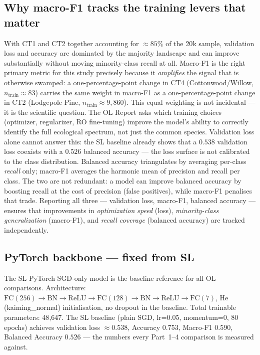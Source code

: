 \documentclass[conference]{IEEEtran}
\begin{document}
\subsection{Why macro-F1 tracks the training levers that matter}\label{sec:data:metric}
With CT1 and CT2 together accounting for ${\approx}85\%$ of the 20k sample,
validation loss and accuracy are dominated by the majority landscape and
can improve substantially without moving minority-class recall at all.
Macro-F1 \cite{sokolova2009pra} is the right primary metric for this study
precisely because it \emph{amplifies} the signal that is otherwise swamped:
a one-percentage-point change in CT4 (Cottonwood/Willow, $n_\text{train}{\approx}83$)
carries the same weight in macro-F1 as a one-percentage-point change in
CT2 (Lodgepole Pine, $n_\text{train}{\approx}9{,}860$).
This equal weighting is not incidental --- it is the scientific question.
The OL Report asks which training choices (optimizer, regularizer, RO fine-tuning)
improve the model's ability to correctly identify the full ecological spectrum,
not just the common species.
Validation loss alone cannot answer this: the SL baseline already shows that
a $0.538$ validation loss coexists with a $0.526$ balanced accuracy ---
the loss surface is not calibrated to the class distribution.
Balanced accuracy triangulates by averaging per-class \emph{recall} only;
macro-F1 averages the harmonic mean of precision and recall per class.
The two are not redundant: a model can improve balanced accuracy by boosting
recall at the cost of precision (false positives), while macro-F1 penalises
that trade.
Reporting all three --- validation loss, macro-F1, balanced accuracy ---
ensures that improvements in \emph{optimization speed} (loss), \emph{minority-class
generalization} (macro-F1), and \emph{recall coverage} (balanced accuracy)
are tracked independently.

\subsection{PyTorch backbone --- fixed from SL}\label{sec:data:backbone}
The SL PyTorch SGD-only model is the baseline reference for all OL
comparisons.
Architecture: $\text{FC}(256)\to\text{BN}\to\text{ReLU}\to
\text{FC}(128)\to\text{BN}\to\text{ReLU}\to\text{FC}(7)$,
He (kaiming\_normal) initialisation, no dropout in the baseline.
Total trainable parameters: 48{,}647.
The SL baseline (plain SGD, lr=0.05, momentum=0, 80 epochs) achieves
validation loss ${\approx}0.538$, Accuracy $0.753$, Macro-F1 $0.590$,
Balanced Accuracy $0.526$ --- the numbers every Part~1--4 comparison is
measured against.
\end{document}
